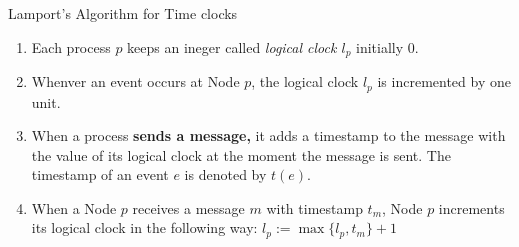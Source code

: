\documentclass{beamer}
\begin{document}
\begin{frame}{Lamport's Algorithm for Time clocks}
\begin{enumerate}
	\item <1-> Each process $p$ keeps an ineger called \textit{logical clock $l_p$} initially 0.
	\item <2-> Whenver an event occurs at Node $p$, the logical clock $l_p$ is incremented by one unit.
	\item <3-> When a process \textbf{sends a message,} it adds a timestamp to the message with the value of its logical clock at the moment the message is sent. The timestamp of an event $e$ is denoted by $t(e)$.
	\item<4-> When a Node $p$ receives a message $m$ with timestamp $t_m$, Node $p$ increments its logical clock in the following way: $l_p := \max\{l_p, t_m\} + 1$
\end{enumerate}
\end{frame}
\end{document}
